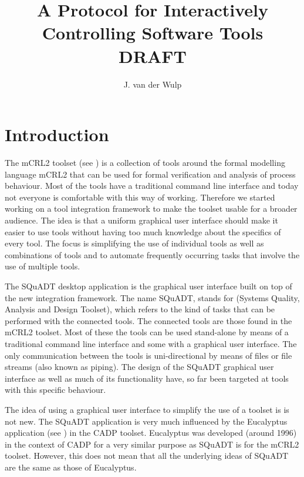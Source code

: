 \documentclass{article}
\title{A Protocol for Interactively Controlling Software Tools\\DRAFT}
\author{J. van der Wulp}
\newcommand{\squadt}{SQuADT\xspace}
\begin{document}
\maketitle
\thispagestyle{empty}

 \section{Introduction}

  The mCRL2 toolset (see \cite{groote_et_al:DSP:2007:862}) is a collection of
  tools around the formal modelling language mCRL2 that can be used for formal
  verification and analysis of process behaviour.  Most of the tools have a
  traditional command line interface and today not everyone is comfortable with
  this way of working.  Therefore we started working on a tool integration
  framework to make the toolset usable for a broader audience. The idea is that
  a uniform graphical user interface should make it easier to use tools without
  having too much knowledge about the specifics of every tool.  The focus is
  simplifying the use of individual tools as well as combinations of tools and
  to automate frequently occurring tasks that involve the use of multiple
  tools.
  
  The \squadt desktop application is the graphical user interface built on top
  of the new integration framework. The name \squadt, stands for (Systems
  Quality, Analysis and Design Toolset), which refers to the kind of tasks that
  can be performed with the connected tools. The connected tools are those
  found in the mCRL2 toolset. Most of these the tools can be used stand-alone
  by means of a traditional command line interface and some with a graphical
  user interface. The only communication between the tools is uni-directional
  by means of files or file streams (also known as piping). The design of the
  \squadt graphical user interface as well as much of its functionality have,
  so far been targeted at tools with this specific behaviour.
  
  The idea of using a graphical user interface to simplify the use of a toolset
  is is not new. The \squadt application is very much influenced by the
  Eucalyptus application (see \cite{CADP}) in the CADP toolset. Eucalyptus was
  developed (around 1996) in the context of CADP for a very similar purpose as
  \squadt is for the mCRL2 toolset. However, this does not mean that all the
  underlying ideas of \squadt are the same as those of Eucalyptus.
  
  
\end{document}
